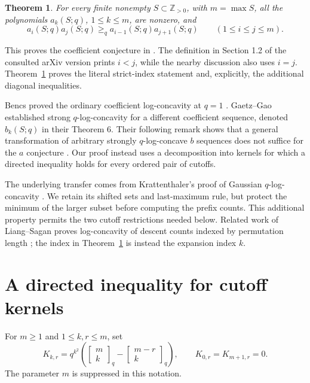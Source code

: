 \documentclass[11pt,a4paper]{article}
\newtheorem{theorem}{Theorem}
\theoremstyle{remark}
\begin{document}
\begin{theorem}\label{thm:main}
For every finite nonempty $S\subset\mathbb Z_{>0}$, with $m=\max S$,
all the polynomials $a_k(S;q)$, $1\leq k\leq m$, are nonzero, and
\begin{equation}\label{eq:main}
 a_i(S;q)a_j(S;q)\geq_q a_{i-1}(S;q)a_{j+1}(S;q)
 \qquad(1\leq i\leq j\leq m).
\end{equation}
\end{theorem}

This proves the coefficient conjecture in
\cite[Conjecture 7]{GaetzGao}. The definition in Section 1.2 of the
consulted arXiv version prints $i<j$, while the nearby discussion also
uses $i=j$. Theorem~\ref{thm:main} proves the literal strict-index
statement and, explicitly, the additional diagonal inequalities.

Bencs proved the ordinary coefficient log-concavity at $q=1$
\cite[arXiv version, Proposition 4.3 and Corollary 4.4]{Bencs}.
Gaetz--Gao established strong $q$-log-concavity for a different
coefficient sequence, denoted $b_k(S;q)$ in their Theorem 6.
Their following remark shows that a general transformation of arbitrary
strongly $q$-log-concave $b$ sequences does not suffice for the $a$
conjecture \cite{GaetzGao}.
Our proof instead uses a decomposition into kernels for which a directed
inequality holds for every ordered pair of cutoffs.

The underlying transfer comes from Krattenthaler's proof of Gaussian
$q$-log-concavity \cite[Section 2]{Krattenthaler}. We retain its shifted
sets and last-maximum rule, but protect the minimum of the larger subset
before computing the prefix counts. This additional property permits
the two cutoff restrictions needed below.
Related work of Liang--Sagan proves log-concavity of descent counts
indexed by permutation length \cite[Theorem 6.6]{LiangSagan}; the index
in Theorem~\ref{thm:main} is instead the expansion index $k$.

\section{A directed inequality for cutoff kernels}

For $m\geq1$ and $1\leq k,r\leq m$, set
\begin{equation}\label{eq:K}
 K_{k,r}=q^{k^2}\left(\left[\begin{smallmatrix}m\\k\end{smallmatrix}\right]_{q}-\left[\begin{smallmatrix}m-r\\k\end{smallmatrix}\right]_{q}\right),
 \qquad K_{0,r}=K_{m+1,r}=0.
\end{equation}
The parameter $m$ is suppressed in this notation.
\end{document}

